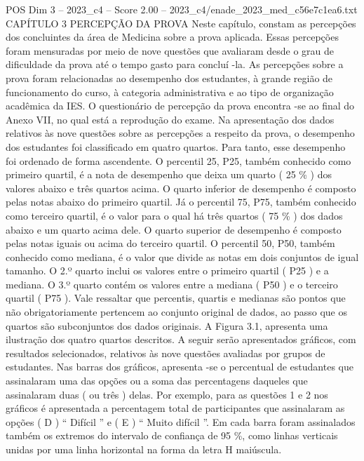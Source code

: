 \begin{textsample}{POS Dim 3 – 2023\_c4 – Score 2.00 – 2023\_c4/enade\_2023\_med\_c56e7c1ea6.txt}  \label{ex:f3_pos_094}
CAPÍTULO 3 PERCEPÇÃO DA PROVA Neste capítulo, constam as percepções dos concluintes da área de Medicina sobre a prova aplicada.
Essas percepções foram mensuradas por meio de nove questões que avaliaram desde o grau de dificuldade da prova até o tempo gasto para concluí -la.
As percepções sobre a prova foram relacionadas ao desempenho dos estudantes, à grande região de funcionamento do curso, à categoria administrativa e ao tipo de organização acadêmica da IES.
O questionário de percepção da prova encontra -se ao final do Anexo VII, no qual está a reprodução do exame.
Na apresentação dos dados relativos às nove questões sobre as percepções a respeito da prova, o desempenho dos estudantes foi classificado em quatro quartos.
Para tanto, esse desempenho foi ordenado de forma ascendente.
O percentil 25, P25, também conhecido como primeiro quartil, é a nota de desempenho que deixa um quarto ( 25 \% ) dos valores abaixo e três quartos acima.
O quarto inferior de desempenho é composto pelas notas abaixo do primeiro quartil.
Já o percentil 75, P75, também conhecido como terceiro quartil, é o valor para o qual há três quartos ( 75 \% ) dos dados abaixo e um quarto acima dele.
O quarto superior de desempenho é composto pelas notas iguais ou acima do terceiro quartil.
O percentil 50, P50, também conhecido como mediana, é o valor que divide as notas em dois conjuntos de igual tamanho.
O 2.º quarto inclui os valores entre o primeiro quartil ( P25 ) e a mediana.
O 3.º quarto contém os valores entre a mediana ( P50 ) e o terceiro quartil ( P75 ).
Vale ressaltar que percentis, quartis e medianas são pontos que não obrigatoriamente pertencem ao conjunto original de dados, ao passo que os quartos são subconjuntos dos dados originais.
A Figura 3.1, apresenta uma ilustração dos quatro quartos descritos.
A seguir serão apresentados gráficos, com resultados selecionados, relativos às nove questões avaliadas por grupos de estudantes.
Nas barras dos gráficos, apresenta -se o percentual de estudantes que assinalaram uma das opções ou a soma das percentagens daqueles que assinalaram duas ( ou três ) delas.
Por exemplo, para as questões 1 e 2 nos gráficos é apresentada a percentagem total de participantes que assinalaram as opções ( D ) “ Difícil ” e ( E ) “ Muito difícil ”.
Em cada barra foram assinalados também os extremos do intervalo de confiança de 95 \%, como linhas verticais unidas por uma linha horizontal na forma da letra H maiúscula.

\end{textsample}
